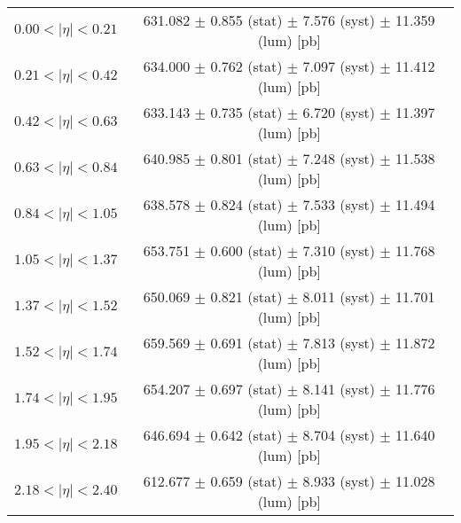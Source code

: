 \begin{tabular}{lc}
\hline
$0.00 < |\eta| <0.21$          & 631.082 $\pm$ 0.855 (stat) $\pm$ 7.576 (syst) $\pm$ 11.359 (lum) [pb]  \\
$0.21 < |\eta| <0.42$          & 634.000 $\pm$ 0.762 (stat) $\pm$ 7.097 (syst) $\pm$ 11.412 (lum) [pb]  \\
$0.42 < |\eta| <0.63$          & 633.143 $\pm$ 0.735 (stat) $\pm$ 6.720 (syst) $\pm$ 11.397 (lum) [pb]  \\
$0.63 < |\eta| <0.84$          & 640.985 $\pm$ 0.801 (stat) $\pm$ 7.248 (syst) $\pm$ 11.538 (lum) [pb]  \\
$0.84 < |\eta| <1.05$          & 638.578 $\pm$ 0.824 (stat) $\pm$ 7.533 (syst) $\pm$ 11.494 (lum) [pb]  \\
$1.05 < |\eta| <1.37$          & 653.751 $\pm$ 0.600 (stat) $\pm$ 7.310 (syst) $\pm$ 11.768 (lum) [pb]  \\
$1.37 < |\eta| <1.52$          & 650.069 $\pm$ 0.821 (stat) $\pm$ 8.011 (syst) $\pm$ 11.701 (lum) [pb]  \\
$1.52 < |\eta| <1.74$          & 659.569 $\pm$ 0.691 (stat) $\pm$ 7.813 (syst) $\pm$ 11.872 (lum) [pb]  \\
$1.74 < |\eta| <1.95$          & 654.207 $\pm$ 0.697 (stat) $\pm$ 8.141 (syst) $\pm$ 11.776 (lum) [pb]  \\
$1.95 < |\eta| <2.18$          & 646.694 $\pm$ 0.642 (stat) $\pm$ 8.704 (syst) $\pm$ 11.640 (lum) [pb]  \\
$2.18 < |\eta| <2.40$          & 612.677 $\pm$ 0.659 (stat) $\pm$ 8.933 (syst) $\pm$ 11.028 (lum) [pb]  \\
\hline
\end{tabular}
